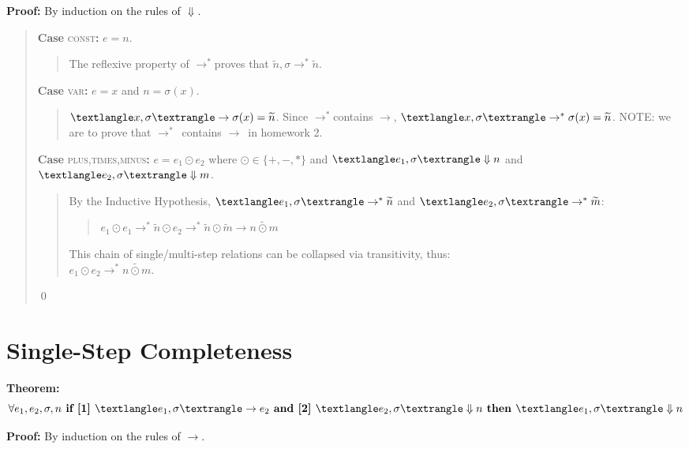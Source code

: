 \documentclass{lecturenotes}
\newcommand{\singlestep}{\ensuremath{\rightarrow}}
\newcommand{\multistep}{\ensuremath{\rightarrow^*}}
\newcommand{\bigstep}{\ensuremath{\Downarrow}}
\newcommand{\config}[1]{\ensuremath{\textlangle #1, \sigma \textrangle}}
\newcommand{\prog}[1]{\ensuremath{\widetilde{#1}}}
\newcommand{\casesc}[3]{
  \textbf{Case} \textsc{#1}\textbf{:} #2
  \begin{quote}
    #3
  \end{quote}
}
\begin{document}
\noindent
\textbf{Proof:} By induction on the rules of \bigstep.
\begin{quote}

  \casesc{const}
  {$e = n$.}
  {
    The reflexive property of \multistep proves that $\prog{n},\sigma \multistep \prog{n}$.
  }

  \casesc{var}
  {$e = x$ and $n = \sigma(x)$.}
  {
    $\config{x} \singlestep \sigma(x) = \prog{n}$.
    Since \multistep contains \singlestep, $\config{x} \multistep \sigma(x) = \prog{n}$.
    NOTE: we are to prove that \multistep\ contains \singlestep\ in homework 2.
  }

  \casesc{plus,times,minus}
  {$e = e_1 \odot e_2$ where $\odot \in \{+,-,*\}$ and $\config{e_1} \bigstep n$ and $\config{e_2} \bigstep m$.}
  {
    By the Inductive Hypothesis, $\config{e_1} \multistep \prog{n}$ and $\config{e_2} \multistep \prog{m}$:
    \begin{quote}
      $e_1 \odot e_1 \multistep \prog{n} \odot e_2 \multistep \prog{n} \odot \prog{m} \singlestep \prog{n \odot m}$ \\
    \end{quote}
    This chain of single/multi-step relations can be collapsed via transitivity, thus: \\
    $e_1 \odot e_2 \multistep \prog{n \odot m}$.
  }

  \qed
\end{quote}

\section{Single-Step Completeness}

\textbf{Theorem:}
$$\forall e_1,e_2,\sigma,n \textbf{ if [1] } \config{e_1} \singlestep e_2 \textbf{ and [2] } \config{e_2} \bigstep n \textbf{ then } \config{e_1} \bigstep n$$

\noindent
\textbf{Proof:} By induction on the rules of \singlestep.
\end{document}
